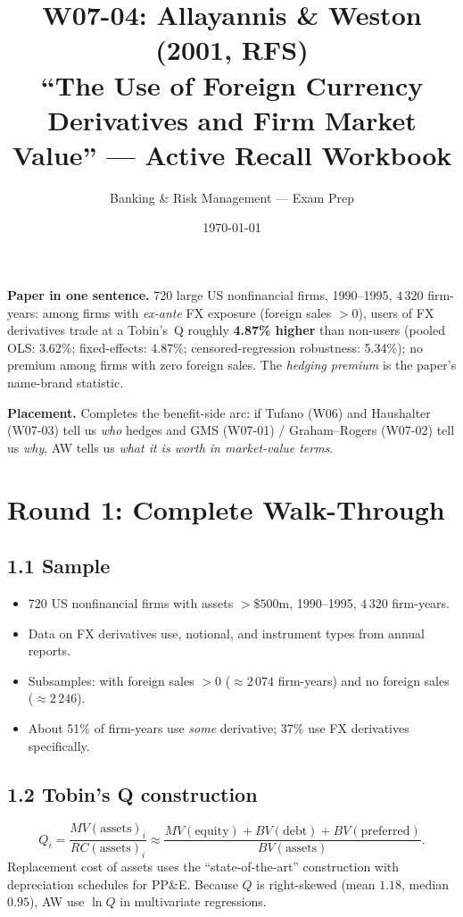 \documentclass[11pt]{article}
\title{W07-04: Allayannis \& Weston (2001, RFS) \\
\large ``The Use of Foreign Currency Derivatives and Firm Market Value'' --- Active Recall Workbook}
\author{Banking \& Risk Management --- Exam Prep}
\date{\today}
\begin{document}
\maketitle

\begin{keybox}
\textbf{Paper in one sentence.} 720 large US nonfinancial firms, 1990--1995, $4\,320$ firm-years: among firms with \emph{ex-ante} FX exposure (foreign sales $>0$), users of FX derivatives trade at a Tobin's~Q roughly \textbf{4.87\% higher} than non-users (pooled OLS: 3.62\%; fixed-effects: 4.87\%; censored-regression robustness: 5.34\%); no premium among firms with zero foreign sales. The \emph{hedging premium} is the paper's name-brand statistic.

\textbf{Placement.} Completes the benefit-side arc: if Tufano (W06) and Haushalter (W07-03) tell us \emph{who} hedges and GMS (W07-01) / Graham--Rogers (W07-02) tell us \emph{why}, AW tells us \emph{what it is worth in market-value terms}.
\end{keybox}

\section*{Round 1: Complete Walk-Through}

\subsection*{1.1 Sample}
\begin{itemize}
\item 720 US nonfinancial firms with assets $> \$500$m, 1990--1995, $4\,320$ firm-years.
\item Data on FX derivatives use, notional, and instrument types from annual reports.
\item Subsamples: with foreign sales $>0$ ($\approx 2\,074$ firm-years) and no foreign sales ($\approx 2\,246$).
\item About 51\% of firm-years use \emph{some} derivative; 37\% use FX derivatives specifically.
\end{itemize}

\subsection*{1.2 Tobin's Q construction}
\[
Q_i=\frac{MV(\text{assets})_i}{RC(\text{assets})_i}\approx \frac{MV(\text{equity})+BV(\text{debt})+BV(\text{preferred})}{BV(\text{assets})}.
\]
Replacement cost of assets uses the ``state-of-the-art'' construction with depreciation schedules for PP\&E. Because $Q$ is right-skewed (mean $1.18$, median $0.95$), AW use $\ln Q$ in multivariate regressions.
\end{document}

